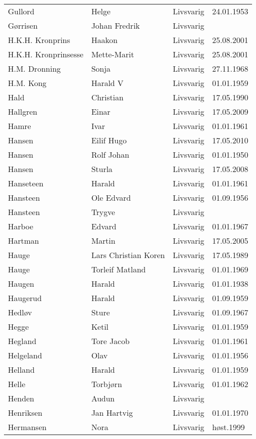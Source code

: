 \begin{longtable}{llll}
Gullord	&	Helge	&	Livsvarig 	&	24.01.1953	\\
Gørrisen	&	Johan Fredrik	&	Livsvarig 	&		\\
H.K.H. Kronprins	&	Haakon 	&	Livsvarig	&	25.08.2001	\\
H.K.H. Kronprinsesse	&	Mette-Marit 	&	Livsvarig	&	25.08.2001	\\
H.M. Dronning	&	Sonja	&	Livsvarig 	&	27.11.1968	\\
H.M. Kong	&	Harald V	&	Livsvarig 	&	01.01.1959	\\
Hald	&	Christian	&	Livsvarig 	&	17.05.1990	\\
Hallgren	&	Einar	&	Livsvarig	&	17.05.2009	\\
Hamre	&	Ivar	&	Livsvarig 	&	01.01.1961	\\
Hansen	&	Eilif Hugo	&	Livsvarig	&	17.05.2010	\\
Hansen	&	Rolf Johan	&	Livsvarig 	&	01.01.1950	\\
Hansen	&	Sturla	&	Livsvarig	&	17.05.2008	\\
Hanseteen	&	Harald	&	Livsvarig 	&	01.01.1961	\\
Hansteen	&	Ole Edvard	&	Livsvarig 	&	01.09.1956	\\
Hansteen	&	Trygve	&	Livsvarig 	&		\\
Harboe	&	Edvard	&	Livsvarig 	&	01.01.1967	\\
Hartman 	&	Martin	&	Livsvarig	&	17.05.2005	\\
Hauge	&	Lars Christian Koren	&	Livsvarig 	&	17.05.1989	\\
Hauge	&	Torleif Matland	&	Livsvarig 	&	01.01.1969	\\
Haugen	&	Harald	&	Livsvarig 	&	01.01.1938	\\
Haugerud	&	Harald	&	Livsvarig 	&	01.09.1959	\\
Hedløv	&	Sture	&	Livsvarig 	&	01.09.1967	\\
Hegge	&	Ketil	&	Livsvarig 	&	01.01.1959	\\
Hegland	&	Tore Jacob	&	Livsvarig 	&	01.01.1961	\\
Helgeland	&	Olav	&	Livsvarig 	&	01.01.1956	\\
Helland	&	Harald	&	Livsvarig 	&	01.01.1959	\\
Helle	&	Torbjørn	&	Livsvarig 	&	01.01.1962	\\
Henden	&	Audun	&	Livsvarig 	&		\\
Henriksen	&	Jan Hartvig	&	Livsvarig 	&	01.01.1970	\\
Hermansen	&	Nora	&	Livsvarig	&	høst.1999	\\

\end{longtable}

